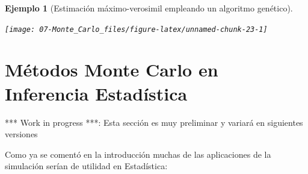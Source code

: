 \documentclass[
]{book}
\newenvironment{Shaded}{\begin{snugshade}}{\end{snugshade}}
\newcommand{\AttributeTok}[1]{\textcolor[rgb]{0.77,0.63,0.00}{#1}}
\newcommand{\CommentTok}[1]{\textcolor[rgb]{0.56,0.35,0.01}{\textit{#1}}}
\newcommand{\DecValTok}[1]{\textcolor[rgb]{0.00,0.00,0.81}{#1}}
\newcommand{\FunctionTok}[1]{\textcolor[rgb]{0.00,0.00,0.00}{#1}}
\newcommand{\NormalTok}[1]{#1}
\newcommand{\SpecialCharTok}[1]{\textcolor[rgb]{0.00,0.00,0.00}{#1}}
\theoremstyle{break}
\newtheorem{example}{Ejemplo}[chapter]
\theoremstyle{nonumberplain}
\renewcommand{\CommentTok}[1]{\textcolor[rgb]{0.41,0.41,0.41}{\texttt{#1}}}
\begin{document}
\begin{example}[Estimación máximo-verosimil empleando un algoritmo genético]
\begin{Shaded}
\end{Shaded}

\begin{center}\texttt{[image: 07-Monte\_Carlo\_files/figure-latex/unnamed-chunk-23-1]} \end{center}

\end{example}

\hypertarget{aplic-inf}{%
\section{Métodos Monte Carlo en Inferencia Estadística}\label{aplic-inf}}

*** Work in progress ***: Esta sección es muy preliminar y variará en siguientes versiones

Como ya se comentó en la introducción muchas de las aplicaciones de la simulación serían de utilidad en Estadística:
\end{document}
